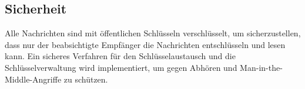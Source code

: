 \subsection{Sicherheit}

Alle Nachrichten sind mit öffentlichen Schlüsseln verschlüsselt, um sicherzustellen, 
dass nur der beabsichtigte Empfänger die Nachrichten entschlüsseln und lesen kann.
Ein sicheres Verfahren für den Schlüsselaustausch und die Schlüsselverwaltung 
wird implementiert, um gegen Abhören und Man-in-the-Middle-Angriffe zu schützen.